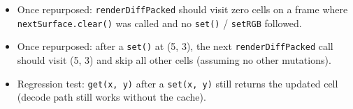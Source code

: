 \begin{itemize}
\tightlist
\item
  Once repurposed: \texttt{r\allowbreak{}e\allowbreak{}n\allowbreak{}d\allowbreak{}e\allowbreak{}r\allowbreak{}D\allowbreak{}i\allowbreak{}f\allowbreak{}f\allowbreak{}P\allowbreak{}a\allowbreak{}c\allowbreak{}k\allowbreak{}e\allowbreak{}d} should visit zero cells on a frame where \texttt{n\allowbreak{}e\allowbreak{}x\allowbreak{}t\allowbreak{}S\allowbreak{}u\allowbreak{}r\allowbreak{}f\allowbreak{}a\allowbreak{}c\allowbreak{}e\allowbreak{}.\allowbreak{}c\allowbreak{}l\allowbreak{}e\allowbreak{}a\allowbreak{}r\allowbreak{}(\allowbreak{})} was called and no \texttt{s\allowbreak{}e\allowbreak{}t\allowbreak{}(\allowbreak{})} / \texttt{s\allowbreak{}e\allowbreak{}t\allowbreak{}R\allowbreak{}G\allowbreak{}B} followed.
\item
  Once repurposed: after a \texttt{s\allowbreak{}e\allowbreak{}t\allowbreak{}(\allowbreak{})} at (5, 3), the next \texttt{r\allowbreak{}e\allowbreak{}n\allowbreak{}d\allowbreak{}e\allowbreak{}r\allowbreak{}D\allowbreak{}i\allowbreak{}f\allowbreak{}f\allowbreak{}P\allowbreak{}a\allowbreak{}c\allowbreak{}k\allowbreak{}e\allowbreak{}d} call should visit (5, 3) and skip all other cells (assuming no other mutations).
\item
  Regression test: \texttt{g\allowbreak{}e\allowbreak{}t\allowbreak{}(\allowbreak{}x\allowbreak{},\allowbreak{} \allowbreak{}y\allowbreak{})} after a \texttt{s\allowbreak{}e\allowbreak{}t\allowbreak{}(\allowbreak{}x\allowbreak{},\allowbreak{} \allowbreak{}y\allowbreak{})} still returns the updated cell (decode path still works without the cache).
\end{itemize}


